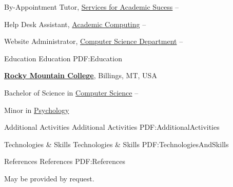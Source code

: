\documentclass[letterpaper,MMMyyyy,nonstopmode]{simpleresumecv}
\begin{document}
\begin{Body}
\Gap
\BulletItem
By-Appointment Tutor,
\href{https://www.rocky.edu/student-life/student-support/academic-support/ServicesAcademicSuccess.php}
{Services for Academic Sucess}
\hfill
{} --
\begin{Detail}
\end{Detail}

\Gap
\BulletItem
Help Desk Assistant,
\href{https://rocky.edu/student-life/student-support/academic-computing/}
{Academic Computing}
\hfill
{} --
\begin{Detail}
\end{Detail}

\Gap
\BulletItem
Website Administrator,
\href{http://cs.rocky.edu/programming-competitions/high-school-competions/}
{Computer Science Department}
\hfill
{} --
\begin{Detail}
\end{Detail}


\Section
{Education}
{Education}
{PDF:Education}

\Entry
\href{http://www.rocky.edu/}
{\textbf{Rocky Mountain College}},
Billings, MT, USA

\Gap
\BulletItem
Bachelor of Science in
\href{http://cs.rocky.edu/}
{Computer Science}
\hfill
{} --
\begin{Detail}
\SubBulletItem
Minor in 
\href{http://rocky.edu/academics/academic-programs/undergraduate-majors/psychology/}
{Psychology}
\end{Detail}


\Section
{Additional \newline Activities}
{Additional Activities}
{PDF:AdditionalActivities}


\Section
{Technologies \newline \& Skills}
{Technologies \& Skills}
{PDF:TechnologiesAndSkills}


\Section
{References}
{References}
{PDF:References}

May be provided by request.

\end{Body}
\end{document}
